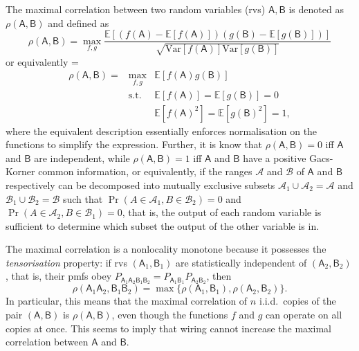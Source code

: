 \documentclass[10pt, a4paper]{article}
\numberwithin{equation}{section} %
\theoremstyle{definition}
\theoremstyle{plain}
\newenvironment{Array}[1] %
{\def\arraystretch{1.75}\everymath={\displaystyle}\begin{equation}\begin{array}{#1}}
{\end{array}\end{equation}}
\newcommand{\?}{\mathrel{?}} %
\newcommand{\E}{\mathbb{E}} %
\newcommand{\Var}{\mathrm{Var}} %
\newcommand{\sA}{\mathcal{A}}
\newcommand{\sB}{\mathcal{B}}
\newcommand{\crv}[1]{\mathsf{#1}}
\begin{document}
    The maximal correlation between two random variables (rvs) \(\crv{A},\crv{B}\) is denoted as \(\rho(\crv{A},\crv{B})\) and defined as~\cite{NLMonotones}
    \begin{equation}
      \rho(\crv{A},\crv{B}) = \max_{f,g} \frac{\E[(f(\crv{A})-\E[f(\crv{A})])(g(\crv{B})-\E[g(\crv{B})])]}{\sqrt{\Var[f(\crv{A})]\Var[g(\crv{B})]}}
    \end{equation}
    or equivalently
    \begin{Array}{rcl}
      \rho(\crv{A},\crv{B}) = & \max_{f,g}  & \E[f(\crv{A})g(\crv{B})] \\
                  & \text{s.t.} & \E[f(\crv{A})] = \E[g(\crv{B})] = 0 \\
                  &             & \E[f(\crv{A})^2] = \E[g(\crv{B})^2] = 1,
    \end{Array}
    where the equivalent description essentially enforces normalisation on the functions to simplify the expression. Further, it is know that \(\rho(\crv{A},\crv{B}) = 0\) iff \(\crv{A}\) and \(\crv{B}\) are independent, while \(\rho(\crv{A},\crv{B}) = 1\) iff \(\crv{A}\) and \(\crv{B}\) have a positive Gacs-Korner common information, or equivalently, if the ranges \(\sA\) and \(\sB\) of \(\crv{A}\) and \(\crv{B}\) respectively can be decomposed into mutually exclusive subsets \(\sA_1 \cup \sA_2 = \sA\) and \(\sB_1 \cup \sB_2 = \sB\) such that \(\Pr(A \in \sA_1, B \in \sB_2) = 0\) and \(\Pr(A \in \sA_2, B \in \sB_1) = 0\), that is, the output of each random variable is sufficient to determine which subset the output of the other variable is in.

    The maximal correlation is a nonlocality monotone because it possesses the \emph{tensorisation} property: if rvs \((\crv{A}_1, \crv{B}_1)\) are statistically independent of \((\crv{A}_2,\crv{B}_2)\), that is, their pmfs obey \(P_{\crv{A}_1\crv{A}_2\crv{B}_1\crv{B}_2} = P_{\crv{A}_1\crv{B}_1}P_{\crv{A}_2\crv{B}_2}\), then
    \begin{equation}
      \rho(\crv{A}_1\crv{A}_2,\crv{B}_1\crv{B}_2) = \max\{ \rho(\crv{A}_1,\crv{B}_1), \rho(\crv{A}_2,\crv{B}_2) \}.
    \end{equation}
    In particular, this means that the maximal correlation of \(n\) i.i.d.\ copies of the pair \((\crv{A},\crv{B})\) is \(\rho(\crv{A},\crv{B})\), even though the functions \(f\) and \(g\) can operate on all copies at once. This seems to imply that wiring cannot increase the maximal correlation between \(\crv{A}\) and \(\crv{B}\).
\end{document}
